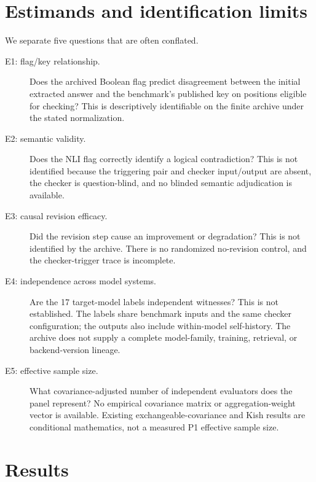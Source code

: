 \documentclass[11pt]{article}
\begin{document}
\section{Estimands and identification limits}
We separate five questions that are often conflated.
\begin{description}
  \item[E1: flag/key relationship.] Does the archived Boolean flag predict disagreement between the initial extracted answer and the benchmark's published key on positions eligible for checking? This is descriptively identifiable on the finite archive under the stated normalization.
  \item[E2: semantic validity.] Does the NLI flag correctly identify a logical contradiction? This is not identified because the triggering pair and checker input/output are absent, the checker is question-blind, and no blinded semantic adjudication is available.
  \item[E3: causal revision efficacy.] Did the revision step cause an improvement or degradation? This is not identified by the archive. There is no randomized no-revision control, and the checker-trigger trace is incomplete.
  \item[E4: independence across model systems.] Are the 17 target-model labels independent witnesses? This is not established. The labels share benchmark inputs and the same checker configuration; the outputs also include within-model self-history. The archive does not supply a complete model-family, training, retrieval, or backend-version lineage.
  \item[E5: effective sample size.] What covariance-adjusted number of independent evaluators does the panel represent? No empirical covariance matrix or aggregation-weight vector is available. Existing exchangeable-covariance and Kish results are conditional mathematics, not a measured P1 effective sample size.
\end{description}

\section{Results}
\end{document}
